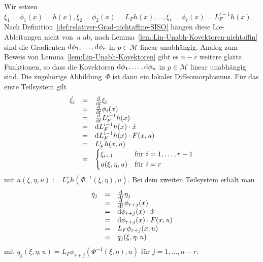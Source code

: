 \begin{svmultproof2}
Wir setzen $\xi_{1}=\phi_{1}(x)=h(x),\xi_{2}=\phi_{2}(x)=L_{F}h(x),\ldots,\xi_{r}=\phi_{r}(x)=L_{F}^{r-1}h(x)$.
Nach Definition~\ref{def:relativer-Grad-nichtaffine-SISO} hängen
diese Lie-Ableitungen nicht von~$u$ ab, nach Lemma~\ref{lem:Lin-Unabh-Kovektoren-nichtaffin}
sind die Gradienten ${\mathrm{d}}\phi_{1},\ldots,{\mathrm{d}}\phi_{r}$ in $p\in\mathcal{M}$
linear unabhängig. Analog zum Beweis von Lemma~\ref{lem:Lin-Unabh-Kovektoren}
gibt es $n-r$ weitere glatte Funktionen, so dass die Kovektoren ${\mathrm{d}}\phi_{1},\ldots,{\mathrm{d}}\phi_{n}$
in $p\in\mathcal{M}$ linear unabhängig sind. Die zugehörige Abbildung~$\Phi$
ist dann ein lokaler Diffeomorphismus. Für das erste Teilsystem gilt
\[
\begin{array}{rcl}
\dot{\xi}_{i} & = & \frac{{\mathrm{d}}}{{\mathrm{d}} t}\xi_{i}\\
 & = & \frac{{\mathrm{d}}}{{\mathrm{d}} t}\phi_{i}(x)\\
 & = & \frac{{\mathrm{d}}}{{\mathrm{d}} t}L_{F}^{i-1}h(x)\\
 & = & {\mathrm{d}} L_{F}^{i-1}h(x)\cdot\dot{x}\\
 & = & {\mathrm{d}} L_{F}^{i-1}h(x)\cdot F(x,u)\\
 & = & L_{F}^{i}h(x,u)\\
 & = & \begin{cases}
\xi_{i+1} & \text{für }i=1,\ldots,r-1\\
a(\xi,\eta,u) & \text{für }i=r
\end{cases}
\end{array}
\]
mit $a(\xi,\eta,u):=L_{F}^{r}h(\Phi^{-1}(\xi,\eta),u)$. Bei dem zweiten
Teilsystem erhält man
\[
\begin{array}{rcl}
\dot{\eta}_{j} & = & \frac{{\mathrm{d}}}{{\mathrm{d}} t}\eta_{j}\\
 & = & \frac{{\mathrm{d}}}{{\mathrm{d}} t}\phi_{r+j}(x)\\
 & = & {\mathrm{d}}\phi_{r+j}(x)\cdot\dot{x}\\
 & = & {\mathrm{d}}\phi_{r+j}(x)\cdot F(x,u)\\
 & = & L_{F}\phi_{r+j}(x,u)\\
 & = & q_{j}(\xi,\eta,u)
\end{array}
\]
mit $q_{j}(\xi,\eta,u)=L_{F}\phi_{r+j}(\Phi^{-1}(\xi,\eta),u)$ für
$j=1,\ldots,n-r$.
\end{svmultproof2}

